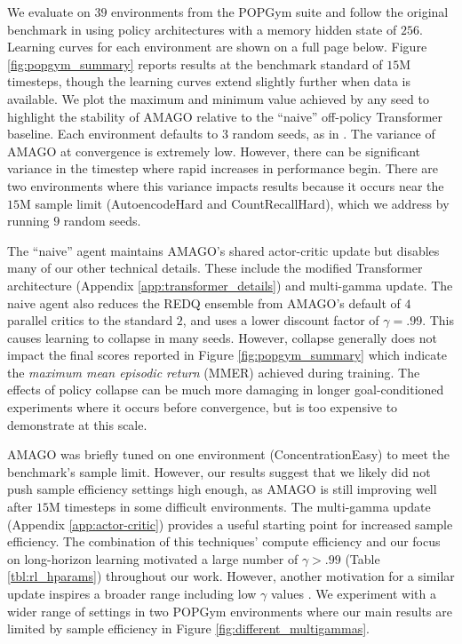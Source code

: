 We evaluate on $39$ environments from the POPGym suite \cite{morad2023popgym} and follow the original benchmark in using policy architectures with a memory hidden state of $256$. Learning curves for each environment are shown on a full page below. Figure \ref{fig:popgym_summary} reports results at the benchmark standard of $15$M timesteps, though the learning curves extend slightly further when data is available. We plot the maximum and minimum value achieved by any seed to highlight the stability of AMAGO relative to the ``naive'' off-policy Transformer baseline. Each environment defaults to $3$ random seeds, as in \cite{morad2023popgym}. The variance of AMAGO at convergence is extremely low. However, there can be significant variance in the timestep where rapid increases in performance begin. There are two environments where this variance impacts results because it occurs near the $15$M sample limit (AutoencodeHard and CountRecallHard), which we address by running $9$ random seeds.

The ``naive'' agent maintains AMAGO's shared actor-critic update but disables many of our other technical details. These include the modified Transformer architecture (Appendix \ref{app:transformer_details}) and multi-gamma update. The naive agent also reduces the REDQ ensemble from AMAGO's default of $4$ parallel critics to the standard $2$, and uses a lower discount factor of $\gamma = .99$. This causes learning to collapse in many seeds. However, collapse generally does not impact the final scores reported in Figure \ref{fig:popgym_summary} which indicate the \textit{maximum mean episodic return} (MMER) achieved during training. The effects of policy collapse can be much more damaging in longer goal-conditioned experiments where it occurs before convergence, but is too expensive to demonstrate at this scale.

AMAGO was briefly tuned on one environment (ConcentrationEasy) to meet the benchmark's sample limit. However, our results suggest that we likely did not push sample efficiency settings high enough, as AMAGO is still improving well after $15$M timesteps in some difficult environments. The multi-gamma update (Appendix \ref{app:actor-critic}) provides a useful starting point for increased sample efficiency. The combination of this techniques' compute efficiency and our focus on long-horizon learning motivated a large number of $\gamma > .99$ (Table \ref{tbl:rl_hparams}) throughout our work. However, another motivation for a similar update inspires a broader range including low $\gamma$ values \cite{fedus2019hyperbolic, ali2022efficient}. We experiment with a wider range of settings in two POPGym environments where our main results are limited by sample efficiency in Figure \ref{fig:different_multigammas}.

